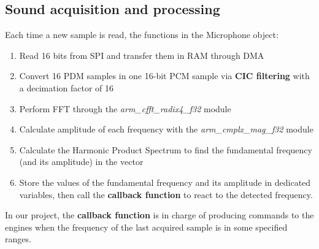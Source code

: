 \subsection{Sound acquisition and processing}
Each time a new sample is read, the functions in the Microphone object:
\begin{enumerate}
	\item Read 16 bits from SPI and transfer them in RAM through DMA
	\item  Convert 16 PDM samples in one 16-bit PCM sample via \textbf{CIC filtering} with a decimation factor of 16
	\item Perform FFT through the \textit{arm\_cfft\_radix4\_f32}  module
	\item Calculate amplitude of each frequency with the \textit{arm\_cmplx\_mag\_f32} module
	\item Calculate the Harmonic Product Spectrum to find the fundamental frequency (and its amplitude) in the vector
	\item Store the values of the fundamental frequency and its amplitude in dedicated variables, then call the \textbf{callback function} to react to the detected frequency.
\end{enumerate}
In our project, the \textbf{callback function} is in charge of producing commands to the engines when the frequency of the last acquired sample is in some specified ranges.

